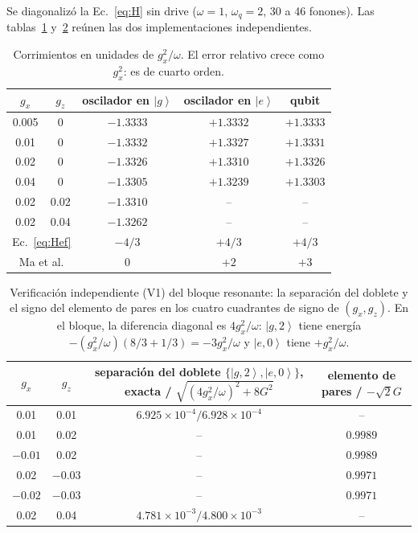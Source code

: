 \documentclass[11pt]{report}
\newcommand{\ket}[1]{\left|#1\right\rangle}
\begin{document}
Se diagonaliz\'o la Ec.~\eqref{eq:H} sin drive ($\omega=1$, $\omega_{q}=2$, 30 a 46 fonones). Las tablas~\ref{tab:ED} y~\ref{tab:ED2} reúnen las dos implementaciones independientes.

\begin{table}[h]
\centering
\begin{tabular}{ccccc}
\toprule
$g_{x}$ & $g_{z}$ & oscilador en $\ket{g}$ & oscilador en $\ket{e}$ & qubit\\
\midrule
0.005 & 0 & $-1.3333$ & $+1.3332$ & $+1.3333$\\
0.01 & 0 & $-1.3332$ & $+1.3327$ & $+1.3331$\\
0.02 & 0 & $-1.3326$ & $+1.3310$ & $+1.3326$\\
0.04 & 0 & $-1.3305$ & $+1.3239$ & $+1.3303$\\
0.02 & 0.02 & $-1.3310$ & -- & --\\
0.02 & 0.04 & $-1.3262$ & -- & --\\
\midrule
\multicolumn{2}{c}{Ec.~\eqref{eq:Hef}} & $-4/3$ & $+4/3$ & $+4/3$\\
\multicolumn{2}{c}{Ma et al.} & 0 & $+2$ & $+3$\\
\bottomrule
\end{tabular}
\caption{Corrimientos en unidades de $g_{x}^{2}/\omega$. El error relativo crece como $g_{x}^{2}$: es de cuarto orden.}
\label{tab:ED}
\end{table}

\begin{table}[h]
\centering
\begin{tabular}{cccc}
\toprule
$g_{x}$ & $g_{z}$ & separaci\'on del doblete $\{\ket{g,2},\ket{e,0}\}$, exacta / $\sqrt{(4g_{x}^{2}/\omega)^{2}+8G^{2}}$ & elemento de pares / $-\sqrt2G$\\
\midrule
0.01 & 0.01 & $6.925\times10^{-4}/6.928\times10^{-4}$ & --\\
0.01 & 0.02 & -- & $0.9989$\\
$-0.01$ & 0.02 & -- & $0.9989$\\
0.02 & $-0.03$ & -- & $0.9971$\\
$-0.02$ & $-0.03$ & -- & $0.9971$\\
0.02 & 0.04 & $4.781\times10^{-3}/4.800\times10^{-3}$ & --\\
\bottomrule
\end{tabular}
\caption{Verificaci\'on independiente (V1) del bloque resonante: la separaci\'on del doblete y el signo del elemento de pares en los cuatro cuadrantes de signo de $(g_{x},g_{z})$. En el bloque, la diferencia diagonal es $4g_{x}^{2}/\omega$: $\ket{g,2}$ tiene energ\'ia $-(g_{x}^{2}/\omega)(8/3+1/3)=-3g_{x}^{2}/\omega$ y $\ket{e,0}$ tiene $+g_{x}^{2}/\omega$.}
\label{tab:ED2}
\end{table}
\end{document}
